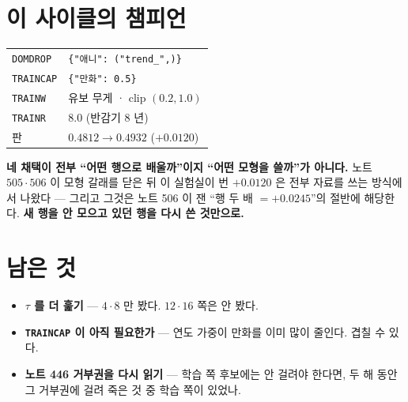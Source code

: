 \documentclass[11pt]{article}
\begin{document}
\section*{이 사이클의 챔피언}

\begin{center}
\begin{tabular}{ll}
\hline
\texttt{DOMDROP} & \texttt{\{"애니": ("trend\_",)\}} \\
\texttt{TRAINCAP} & \texttt{\{"만화": 0.5\}} \\
\texttt{TRAINW} & 유보 무게 · clip $(0.2, 1.0)$ \\
\texttt{TRAINR} & $8.0$ (반감기 $8$ 년) \\
\hline
판 & $0.4812 \to \mathbf{0.4932}$ ($+0.0120$) \\
\hline
\end{tabular}
\end{center}

\textbf{네 채택이 전부 ``어떤 행으로 배울까''이지 ``어떤 모형을 쓸까''가
아니다.} 노트 $505 \cdot 506$ 이 모형 갈래를 닫은 뒤 이 실험실이 번
$+0.0120$ 은 전부 자료를 쓰는 방식에서 나왔다 --- 그리고 그것은 노트 506 이
잰 ``행 두 배 $= +0.0245$''의 절반에 해당한다. \textbf{새 행을 안 모으고
있던 행을 다시 쓴 것만으로.}

\section*{남은 것}

\begin{itemize}
\item \textbf{$\tau$ 를 더 훑기} --- $4 \cdot 8$ 만 봤다. $12 \cdot 16$
쪽은 안 봤다.
\item \textbf{\texttt{TRAINCAP} 이 아직 필요한가} --- 연도 가중이 만화를
이미 많이 줄인다. 겹칠 수 있다.
\item \textbf{노트 446 거부권을 다시 읽기} --- 학습 쪽 후보에는 안 걸려야
한다면, 두 해 동안 그 거부권에 걸려 죽은 것 중 학습 쪽이 있었나.
\end{itemize}
\end{document}
